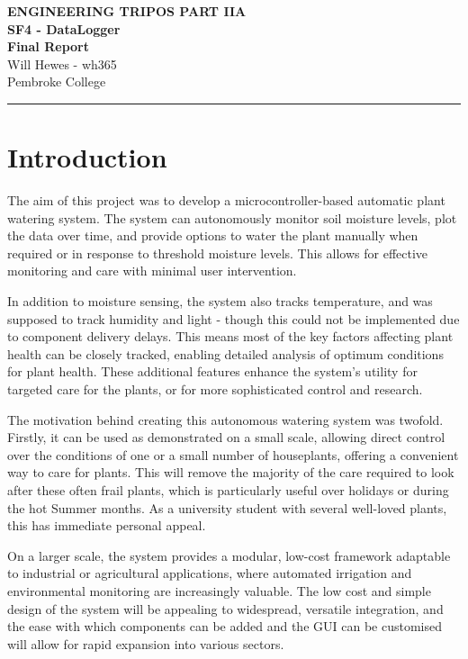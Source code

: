 \documentclass[a4paper,11pt]{article}
\renewcommand{\maketitle}{
    \begin{center}
        \LARGE \textbf{ENGINEERING TRIPOS PART IIA} \\[0.5em]
        \Large \textbf{SF4 - DataLogger} \\
        \textbf{Final Report} \\
        \small Will Hewes - wh365 \\ 
        Pembroke College \\ 
        \vspace{0.5em}
    \end{center}
}
\begin{document}

\maketitle
\hrule
\tableofcontents
\newpage
{} \setcounter{page}{1}

\section{Introduction}
\label{sec:introduction}

The aim of this project was to develop a microcontroller-based 
automatic plant watering system.
The system can autonomously monitor soil moisture levels, 
plot the data over time, and provide options to water the plant
manually when required or in response to threshold moisture levels.
This allows for effective monitoring and care with minimal user intervention.

In addition to moisture sensing, the system also tracks temperature, 
and was supposed to track humidity and light -
though this could not be implemented due to component delivery delays.
This means most of the key factors affecting plant health
can be closely tracked, enabling detailed analysis of
optimum conditions for plant health.
These additional features enhance the system's utility for targeted care for the plants,
or for more sophisticated control and research.

The motivation behind creating this autonomous watering system was twofold. 
Firstly, it can be used as demonstrated on a small scale,
allowing direct control over the conditions of one 
or a small number of houseplants,
offering a convenient way to care for plants.
This will remove the majority of the care required
to look after these often frail plants,
which is particularly useful over holidays or 
during the hot Summer months.
As a university student with several well-loved plants,
this has immediate personal appeal.

On a larger scale, the system provides a modular, 
low-cost framework adaptable to industrial or agricultural applications, 
where automated irrigation and environmental monitoring are increasingly valuable.
The low cost and simple design of the system will be appealing 
to widespread, versatile integration,
and the ease with which components can be added
and the GUI can be customised will allow for rapid expansion into various sectors.
\end{document}

